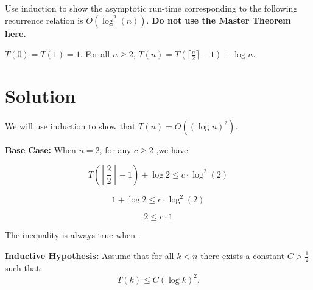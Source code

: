 \documentclass[11pt]{article}
\begin{document}
    \setlength{\headheight}{26pt}
    \pagestyle{fancy}
    \fancyfoot[C]{}
    \fancyfoot[R]{\thepage}
    \renewcommand{\headrulewidth}{0.4pt}
    \renewcommand{\footrulewidth}{0.4 pt}
    
	
    
    \begin{tcolorbox}[title={Problem 1A (Recurrence Relations — 3 Styles, 9 pts)}]
        Use induction to show the asymptotic run-time corresponding to the following recurrence relation is $O(\log^2(n))$. \textbf{Do not use the Master Theorem here.}
        \begin{center}
            $T(0) = T(1) = 1$. For all $n\geq 2$, $T(n) = T(\lceil\frac{n}{2}\rceil-1) + \log n$.
        \end{center}
    \end{tcolorbox}
    \section*{Solution}

        We will use induction to show that \( T(n)=O((\log n)^2) \).

        \textbf{Base Case:}  
        When $n = 2$, for any $c \geq 2$ ,we have

        \[
        T\left(\left\lfloor \frac{2}{2} \right\rfloor - 1\right) + \log 2 \leq c \cdot \log^2(2)
        \]

        \[
        1 + \log 2 \leq c \cdot \log^2(2)
        \]

        \[
        2 \leq c \cdot 1
        \]

        The inequality is always true when .

        \textbf{Inductive Hypothesis:}  
        Assume that for all \( k < n \) there exists a constant \( C > \frac{1}{2} \) such that:
        \[
        T(k) \le C (\log k)^2.
        \]
\end{document}
